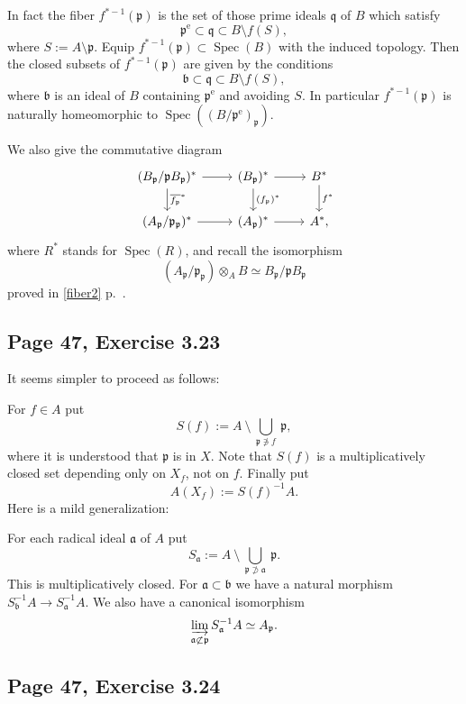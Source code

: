\documentclass[parskip=half,fontsize=12pt]{scrartcl}%
\newcommand{\oo}{\operatorname}\newcommand{\ooo}{\operatorname*}
\newcommand{\mf}{\mathfrak}
\newcommand{\aaa}{\mf a}
\newcommand{\bbb}{\mf b}
\newcommand{\ppp}{\mf p}
\newcommand{\qqq}{\mf q}
\newcommand{\Spec}{\operatorname{Spec}}\newcommand{\Sp}{\operatorname{Spec}}
\begin{document}
In fact the fiber $f^{*-1}(\ppp)$ is the set of those prime ideals $\qqq$ of $B$ which satisfy 
$$
\ppp^{\oo{e}}\subset\qqq\subset B\setminus f(S),
$$ 
where $S:=A\setminus\ppp$. Equip $f^{*-1}(\ppp)\subset\Spec(B)$ with the induced topology. Then the closed subsets of $f^{*-1}(\ppp)$ are given by the conditions 
$$
\bbb\subset\qqq\subset B\setminus f(S),
$$ 
where $\bbb$ is an ideal of $B$ containing $\ppp^{\oo{e}}$ and avoiding $S$. In particular $f^{*-1}(\ppp)$ is naturally homeomorphic to $\Spec((B/\ppp^{\oo{e}})_\ppp)$.

We also give the commutative diagram
$$
\begin{tikzcd}
(B_\ppp/\ppp B_\ppp)^*\ar[d,"\overline{f_\ppp}^*"]\ar[r]&(B_\ppp)^*\ar[d,"(f_\ppp)^*"]\ar[r]& B^*\ar[d,"f^*"]\\ 
(A_\ppp/\ppp_\ppp)^*\ar[r]&(A_\ppp)^*\ar[r]& A^*,
\end{tikzcd}
$$ 
where $R^*$ stands for $\oo{Spec}(R)$, and recall the isomorphism 
$$
(A_\ppp/\ppp_\ppp)\otimes_AB\simeq B_\ppp/\ppp B_\ppp
$$ 
proved in \eqref{fiber2} p.~\pageref{fiber2}. %

\subsection{Page 47, Exercise 3.23}%

It seems simpler to proceed as follows:

For $f\in A$ put 
$$
S(f):=A\ \setminus\ \bigcup_{\ppp\notni f}\ \ppp,
$$ 
where it is understood that $\ppp$ is in $X$. Note that $S(f)$ is a multiplicatively closed set depending only on $X_f$, not on $f$. Finally put 
$$
A(X_f):=S(f)^{-1}A.
$$ 
Here is a mild generalization: 

For each radical ideal $\aaa$ of $A$ put 
$$
S_\aaa:=A\ \setminus\ \bigcup_{\ppp\not\supset\aaa}\ \ppp.
$$ 
This is multiplicatively closed. For $\aaa\subset\bbb$ we have a natural morphism $S_{\bbb}^{-1}A\to S_\aaa^{-1}A$. We also have a canonical isomorphism 
$$
\varinjlim_{\aaa\not\subset\ppp}S_\aaa^{-1}A\simeq A_\ppp.
$$

\subsection{Page 47, Exercise 3.24}%
\end{document}
